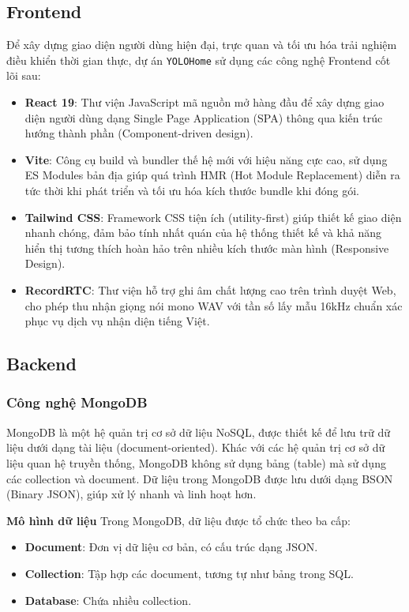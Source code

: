 \subsection{Frontend}
Để xây dựng giao diện người dùng hiện đại, trực quan và tối ưu hóa trải nghiệm điều khiển thời gian thực, dự án \texttt{YOLOHome} sử dụng các công nghệ Frontend cốt lõi sau:
\begin{itemize}
    \item \textbf{React 19}: Thư viện JavaScript mã nguồn mở hàng đầu để xây dựng giao diện người dùng dạng Single Page Application (SPA) thông qua kiến trúc hướng thành phần (Component-driven design).
    \item \textbf{Vite}: Công cụ build và bundler thế hệ mới với hiệu năng cực cao, sử dụng ES Modules bản địa giúp quá trình HMR (Hot Module Replacement) diễn ra tức thời khi phát triển và tối ưu hóa kích thước bundle khi đóng gói.
    \item \textbf{Tailwind CSS}: Framework CSS tiện ích (utility-first) giúp thiết kế giao diện nhanh chóng, đảm bảo tính nhất quán của hệ thống thiết kế và khả năng hiển thị tương thích hoàn hảo trên nhiều kích thước màn hình (Responsive Design).
    \item \textbf{RecordRTC}: Thư viện hỗ trợ ghi âm chất lượng cao trên trình duyệt Web, cho phép thu nhận giọng nói mono WAV với tần số lấy mẫu 16kHz chuẩn xác phục vụ dịch vụ nhận diện tiếng Việt.
\end{itemize}

\subsection{Backend}

\subsubsection{Công nghệ MongoDB} 


MongoDB là một hệ quản trị cơ sở dữ liệu NoSQL, được thiết kế để lưu trữ dữ liệu dưới dạng tài liệu (document-oriented). Khác với các hệ quản trị cơ sở dữ liệu quan hệ truyền thống, MongoDB không sử dụng bảng (table) mà sử dụng các collection và document. Dữ liệu trong MongoDB được lưu dưới dạng BSON (Binary JSON), giúp xử lý nhanh và linh hoạt hơn.

\textbf{Mô hình dữ liệu}
Trong MongoDB, dữ liệu được tổ chức theo ba cấp:
\begin{itemize}
    \item \textbf{Document}: Đơn vị dữ liệu cơ bản, có cấu trúc dạng JSON.
    \item \textbf{Collection}: Tập hợp các document, tương tự như bảng trong SQL.
    \item \textbf{Database}: Chứa nhiều collection.
\end{itemize}

